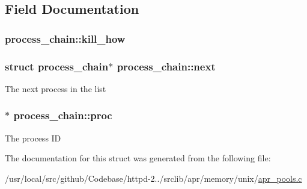 \subsection{Field Documentation}
\subsubsection[{\texorpdfstring{kill\+\_\+how}{kill_how}}]{ process\+\_\+chain\+::kill\+\_\+how}\hypertarget{structprocess__chain_a317362693ef206fbaa8d716f6ca95947}{}\label{structprocess__chain_a317362693ef206fbaa8d716f6ca95947}
\subsubsection[{\texorpdfstring{next}{next}}]{\setlength{\rightskip}{0pt plus 5cm}struct {\bf process\+\_\+chain}$\ast$ process\+\_\+chain\+::next}\hypertarget{structprocess__chain_afa4b764a6d2c8e02d6be043738161ee6}{}\label{structprocess__chain_afa4b764a6d2c8e02d6be043738161ee6}
The next process in the list 
\subsubsection[{\texorpdfstring{proc}{proc}}]{$\ast$ process\+\_\+chain\+::proc}\hypertarget{structprocess__chain_af0ad556e0fb0ea76de33ce6734dad6c3}{}\label{structprocess__chain_af0ad556e0fb0ea76de33ce6734dad6c3}
The process ID 

The documentation for this struct was generated from the following file\+:\begin{DoxyCompactItemize}
\item 
/usr/local/src/github/\+Codebase/httpd-\/2../srclib/apr/memory/unix/\hyperlink{apr__pools_8c}{apr\+\_\+pools.\+c}\end{DoxyCompactItemize}
